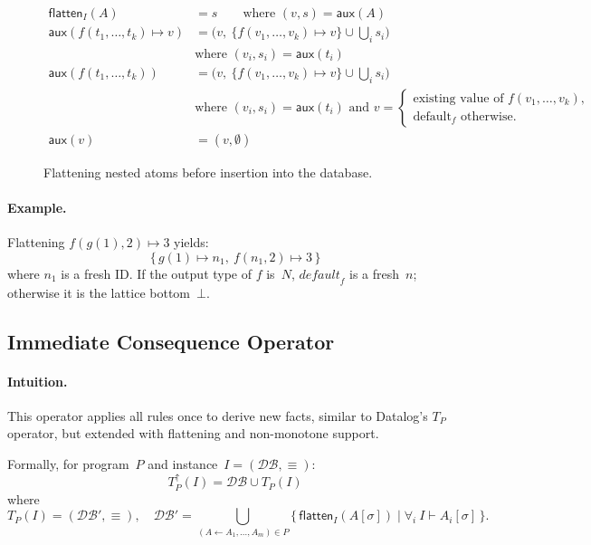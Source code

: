 \documentclass[acmsmall,screen, nonacm, anonymous]{acmart}
\newcommand{\DB}{\mathcal{DB}}               %
\newcommand{\flatten}{\mathsf{flatten}}     %
\newcommand{\aux}{\mathsf{aux}}             %
\begin{document}
\begin{figure}[h]
\begin{align*}
    \flatten_I(A) &= s \qquad \text{where } (v, s) = \aux(A)&\\
    \aux(f(t_1,\ldots,t_k)\mapsto v)
      &= \bigl(v,\ \{f(v_1,\ldots,v_k)\mapsto v\}
                   \cup \bigcup_i s_i\bigr)\\
      &\text{where } (v_i,s_i)=\aux(t_i)\\[1ex]
    \aux(f(t_1,\ldots,t_k))
      &= \bigl(v,\ \{f(v_1,\ldots,v_k)\mapsto v\}
                   \cup \bigcup_i s_i\bigr)\\
      &\text{where } (v_i,s_i)=\aux(t_i)
         \text{ and }
         v=\begin{cases}
              \text{existing value of } f(v_1,\ldots,v_k),\\
              \text{default}_f \text{ otherwise.}
            \end{cases}\\
    \aux(v)&=(v,\emptyset)
\end{align*}
\caption{Flattening nested atoms before insertion into the database.}
\end{figure}

\paragraph{Example.}
Flattening
$f(g(1),2)\mapsto 3$
yields:
\[
\{\, g(1)\mapsto n_1,\ f(n_1,2)\mapsto 3 \,\}
\]
where $n_1$ is a fresh ID.
If the output type of $f$ is~$N$, $\textit{default}_f$ is a fresh~$n$;
otherwise it is the lattice bottom~$\bot$.


\subsection{Immediate Consequence Operator}

\paragraph{Intuition.}
This operator applies all rules once to derive new facts,
similar to Datalog’s $T_P$ operator,
but extended with flattening and non-monotone support.

Formally, for program~$P$ and instance~$I=(\DB,\equiv)$:
\[
  T_P^\uparrow(I) = \DB \cup T_P(I)
\]
where
\[
  T_P(I) = (\DB', \equiv), \quad
  \DB' = 
    \bigcup_{(A\gets A_1,\ldots,A_m)\in P}
    \{\, \flatten_I(A[\sigma]) \mid
         \forall_i\ I\vdash A_i[\sigma] \,\}.
\]
\end{document}
